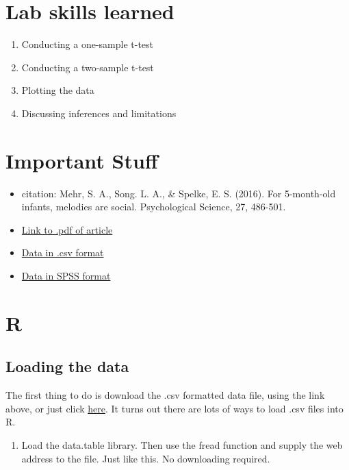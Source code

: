 \documentclass[]{book}
\providecommand{\tightlist}{%
  \setlength{\itemsep}{0pt}\setlength{\parskip}{0pt}}
\theoremstyle{definition}
\theoremstyle{definition}
\theoremstyle{definition}
\theoremstyle{remark}
\begin{document}
\section{Lab skills learned}\label{lab-skills-learned}

\begin{enumerate}
\def\labelenumi{\arabic{enumi}.}
\tightlist
\item
  Conducting a one-sample t-test
\item
  Conducting a two-sample t-test
\item
  Plotting the data
\item
  Discussing inferences and limitations
\end{enumerate}

\section{Important Stuff}\label{important-stuff}

\begin{itemize}
\tightlist
\item
  citation: Mehr, S. A., Song. L. A., \& Spelke, E. S. (2016). For
  5-month-old infants, melodies are social. Psychological Science, 27,
  486-501.
\item
  \href{http://journals.sagepub.com/stoken/default+domain/d5HcBHg85XamSXGdYqYN/full}{Link
  to .pdf of article}
\item
  \href{https://drive.google.com/open?id=0Bz-rhZ21ShvOdW1wV0pmUTJSSk0}{Data
  in .csv format}
\item
  \href{https://drive.google.com/open?id=0Bz-rhZ21ShvOa3c4X3hqOWxwcUU}{Data
  in SPSS format}
\end{itemize}

\section{R}\label{r-6}

\subsection{Loading the data}\label{loading-the-data}

The first thing to do is download the .csv formatted data file, using
the link above, or just click
\href{https://drive.google.com/open?id=0Bz-rhZ21ShvOdW1wV0pmUTJSSk0}{here}.
It turns out there are lots of ways to load .csv files into R.

\begin{enumerate}
\def\labelenumi{\arabic{enumi}.}
\tightlist
\item
  Load the data.table library. Then use the fread function and supply
  the web address to the file. Just like this. No downloading required.
\end{enumerate}
\end{document}
